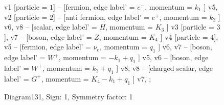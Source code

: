 \documentclass{revtex4}
\begin{document}
\begin{figure}[!htb]
\begin{center}
{    %
v1 [particle = \(1\)] -- [fermion, edge label' = \(e^{-}\), momentum = \(k_{1}\) ] v5, 
v2 [particle = \(2\)] -- [anti fermion, edge label' = \(e^{+}\), momentum = \(k_{2}\) ] v6, 
v8 -- [scalar, edge label' = \(H\), momentum = \(K_{3}\) ] v3 [particle = \(3\)], 
v7 -- [boson, edge label' = \(Z\), momentum = \(K_{4}\) ] v4 [particle = \(4\)], 
v5 -- [fermion, edge label' = \(\nu_{e}\), momentum = \(q_{1}\) ] v6, 
v7 -- [boson, edge label' = \(W^{+}\), momentum = \(-k_{1} + q_{1}\) ] v5, 
v6 -- [boson, edge label' = \(W^{+}\), momentum = \(k_{2} + q_{1}\) ] v8, 
v8 -- [charged scalar, edge label' = \(G^{+}\), momentum = \(K_{4} - k_{1} + q_{1}\) ] v7, 
};
\end{center}
\caption{Diagram131, Sign: 1, Symmetry factor: 1}
\end{figure}
\newpage
\end{document}
